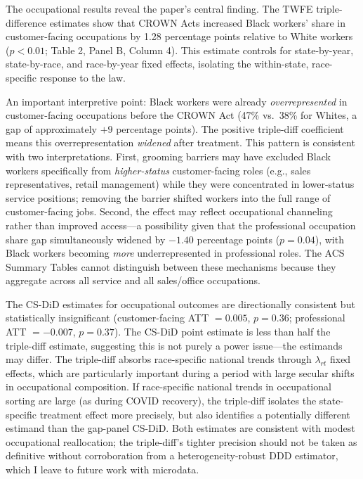 \documentclass[12pt]{article}
\begin{document}
The occupational results reveal the paper's central finding. The TWFE triple-difference estimates show that CROWN Acts increased Black workers' share in customer-facing occupations by 1.28 percentage points relative to White workers ($p < 0.01$; Table 2, Panel B, Column 4). This estimate controls for state-by-year, state-by-race, and race-by-year fixed effects, isolating the within-state, race-specific response to the law.

An important interpretive point: Black workers were already \textit{overrepresented} in customer-facing occupations before the CROWN Act (47\% vs.\ 38\% for Whites, a gap of approximately $+9$ percentage points). The positive triple-diff coefficient means this overrepresentation \textit{widened} after treatment. This pattern is consistent with two interpretations. First, grooming barriers may have excluded Black workers specifically from \textit{higher-status} customer-facing roles (e.g., sales representatives, retail management) while they were concentrated in lower-status service positions; removing the barrier shifted workers into the full range of customer-facing jobs. Second, the effect may reflect occupational channeling rather than improved access---a possibility given that the professional occupation share gap simultaneously widened by $-1.40$ percentage points ($p = 0.04$), with Black workers becoming \textit{more} underrepresented in professional roles. The ACS Summary Tables cannot distinguish between these mechanisms because they aggregate across all service and all sales/office occupations.

The CS-DiD estimates for occupational outcomes are directionally consistent but statistically insignificant (customer-facing ATT $= 0.005$, $p = 0.36$; professional ATT $= -0.007$, $p = 0.37$). The CS-DiD point estimate is less than half the triple-diff estimate, suggesting this is not purely a power issue---the estimands may differ. The triple-diff absorbs race-specific national trends through $\lambda_{rt}$ fixed effects, which are particularly important during a period with large secular shifts in occupational composition. If race-specific national trends in occupational sorting are large (as during COVID recovery), the triple-diff isolates the state-specific treatment effect more precisely, but also identifies a potentially different estimand than the gap-panel CS-DiD. Both estimates are consistent with modest occupational reallocation; the triple-diff's tighter precision should not be taken as definitive without corroboration from a heterogeneity-robust DDD estimator, which I leave to future work with microdata.
\end{document}
